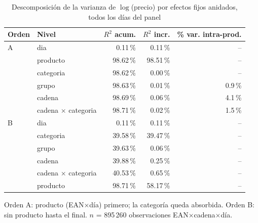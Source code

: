 \begin{table}[htbp]
\caption{Descomposici\'on de la varianza de $\log$(precio) por efectos fijos anidados, todos los d\'ias del panel}
\label{tab:varianza}
\centering\scriptsize\setlength{\tabcolsep}{3pt}
\begin{tabular}{@{}llrrr@{}}
\toprule
Orden & Nivel & $R^2$ acum. & $R^2$ incr. & \% var. intra-prod. \\
\midrule
A & dia & 0.11\,\% & 0.11\,\% & -- \\
 & producto & 98.62\,\% & 98.51\,\% & -- \\
 & categoria & 98.62\,\% & 0.00\,\% & -- \\
 & grupo & 98.63\,\% & 0.01\,\% & 0.9\,\% \\
 & cadena & 98.69\,\% & 0.06\,\% & 4.1\,\% \\
 & cadena $\times$ categoria & 98.71\,\% & 0.02\,\% & 1.5\,\% \\
\midrule
B & dia & 0.11\,\% & 0.11\,\% & -- \\
 & categoria & 39.58\,\% & 39.47\,\% & -- \\
 & grupo & 39.63\,\% & 0.06\,\% & -- \\
 & cadena & 39.88\,\% & 0.25\,\% & -- \\
 & cadena $\times$ categoria & 40.53\,\% & 0.65\,\% & -- \\
 & producto & 98.71\,\% & 58.17\,\% & -- \\
\bottomrule\end{tabular}
\par\smallskip\raggedright\scriptsize Orden A: producto (EAN$\times$d\'ia) primero; la categor\'ia queda absorbida. Orden B: sin producto hasta el final. $n$ = 895\,260 observaciones EAN$\times$cadena$\times$d\'ia.
\end{table}
